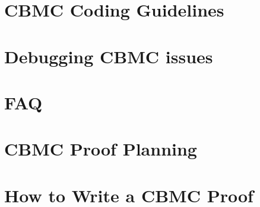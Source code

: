 \documentclass[twoside]{book}
\newcommand{\+}{\discretionary{\mbox{\scriptsize$\hookleftarrow$}}{}{}}
\begin{document}
\chapter{CBMC Coding Guidelines}
\label{md_crt_aws_crt_cpp_crt_aws_c_common_verification_cbmc_templates_training_material__c_o_d_i_n_g__f_o_r__v_e_r_i_f_i_c_a_t_i_o_n}

\chapter{Debugging CBMC issues}
\label{md_crt_aws_crt_cpp_crt_aws_c_common_verification_cbmc_templates_training_material__d_e_b_u_g__c_b_m_c}

\chapter{FAQ}
\label{md_crt_aws_crt_cpp_crt_aws_c_common_verification_cbmc_templates_training_material__f_a_q}

\chapter{CBMC Proof Planning}
\label{md_crt_aws_crt_cpp_crt_aws_c_common_verification_cbmc_templates_training_material__p_l_a_n_n_i_n_g}

\chapter{How to Write a CBMC Proof}
\label{md_crt_aws_crt_cpp_crt_aws_c_common_verification_cbmc_templates_training_material__p_r_o_o_f__w_r_i_t_i_n_g}

\end{document}
